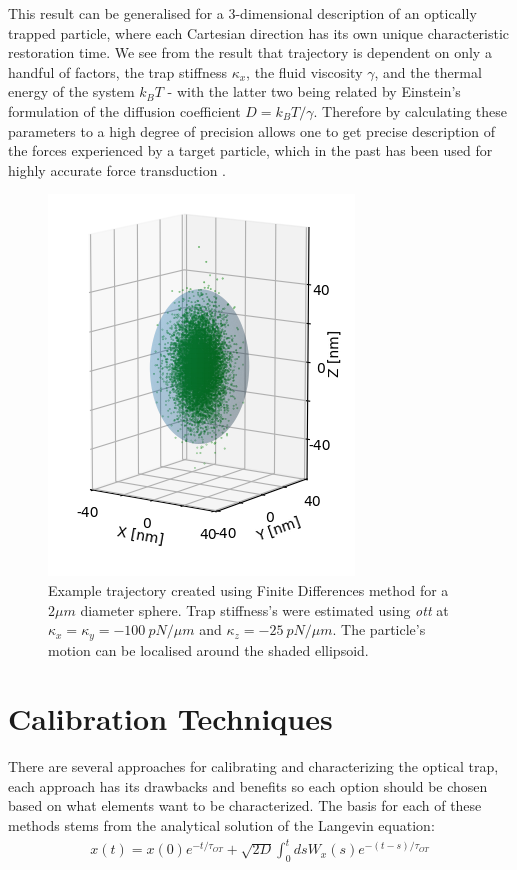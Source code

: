 This result can be generalised for a 3-dimensional description of an 
optically trapped particle, where each Cartesian direction has its 
own unique characteristic restoration time. We see from the result 
that trajectory is dependent on only a handful of factors, the trap 
stiffness $\kappa_x$, the fluid viscosity $\gamma$, and the thermal 
energy of the system $k_BT$ - with the latter two being related by 
Einstein's formulation of the diffusion coefficient $D = k_BT/\gamma$. 
Therefore by calculating these parameters to a high degree of precision 
allows one to get precise description of the forces experienced by a 
target particle, which in the past has been used for highly accurate 
force transduction \cite{BergSoerensen2004, Smith2003}.

\begin{figure}[h]
	\centering
	\includegraphics[width=0.67\linewidth]{finite_differences.png}
	\caption{Example trajectory created using Finite Differences method
			 for a $2\mu m$ diameter sphere. Trap stiffness's were estimated using \textit{ott} at $\kappa_x = \kappa_y = -100\ pN/\mu m$ and $\kappa_z = -25\ pN/\mu m$. The particle's motion can be localised around the shaded ellipsoid.}
\end{figure}

\section{Calibration Techniques}
\label{sec:calibration_techniques}
There are several approaches for calibrating and characterizing the 
optical trap, each approach has its drawbacks and benefits so each 
option should be chosen based on what elements want to be characterized. 
The basis for each of these methods stems from the analytical solution 
of the Langevin equation:
\begin{align}
	\label{eq:anylitical_lang}
	x(t) = x(0)e^{-t/\tau_{OT}}+\sqrt{2D}\int^t_0dsW_x(s)e^{-(t-s)/\tau_{OT}}
\end{align}

